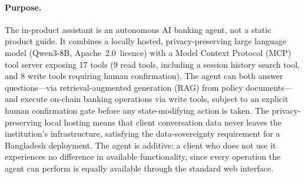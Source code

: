 \documentclass[12pt,a4paper]{report}
\begin{document}
\paragraph{Purpose.}
The in-product assistant is an autonomous AI banking agent, not a static product guide. It combines a locally hosted, privacy-preserving large language model (Qwen3-8B, Apache~2.0~licence) with a Model Context Protocol (MCP) tool server exposing 17 tools (9 read tools, including a session history search tool, and 8 write tools requiring human confirmation). The agent can both answer questions---via retrieval-augmented generation (RAG) from policy documents---and execute on-chain banking operations via write tools, subject to an explicit human confirmation gate before any state-modifying action is taken. The privacy-preserving local hosting means that client conversation data never leaves the institution's infrastructure, satisfying the data-sovereignty requirement for a Bangladesh deployment. The agent is additive: a client who does not use it experiences no difference in available functionality, since every operation the agent can perform is equally available through the standard web interface.
\end{document}
